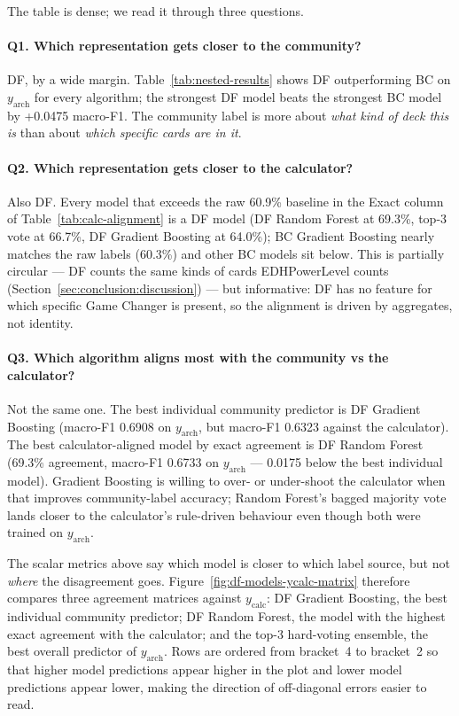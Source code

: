 \documentclass{article}
\begin{document}
The table is dense; we read it through three questions.

\paragraph{Q1. Which representation gets closer to the community?} DF, by a wide margin. Table~\ref{tab:nested-results} shows DF outperforming BC on \(y_{\text{arch}}\) for every algorithm; the strongest DF model beats the strongest BC model by +0.0475 macro-F1. The community label is more about \textit{what kind of deck this is} than about \textit{which specific cards are in it}.

\paragraph{Q2. Which representation gets closer to the calculator?} Also DF. Every model that exceeds the raw 60.9\% baseline in the Exact column of Table~\ref{tab:calc-alignment} is a DF model (DF Random Forest at 69.3\%, top-3 vote at 66.7\%, DF Gradient Boosting at 64.0\%); BC Gradient Boosting nearly matches the raw labels (60.3\%) and other BC models sit below. This is partially circular --- DF counts the same kinds of cards EDHPowerLevel counts (Section~\ref{sec:conclusion:discussion}) --- but informative: DF has no feature for which specific Game Changer is present, so the alignment is driven by aggregates, not identity.

\paragraph{Q3. Which algorithm aligns most with the community vs the calculator?} Not the same one. The best individual community predictor is DF Gradient Boosting (macro-F1 0.6908 on \(y_{\text{arch}}\), but macro-F1 0.6323 against the calculator). The best calculator-aligned model by exact agreement is DF Random Forest (69.3\% agreement, macro-F1 0.6733 on \(y_{\text{arch}}\) --- 0.0175 below the best individual model). Gradient Boosting is willing to over- or under-shoot the calculator when that improves community-label accuracy; Random Forest's bagged majority vote lands closer to the calculator's rule-driven behaviour even though both were trained on \(y_{\text{arch}}\).

The scalar metrics above say which model is closer to which label source, but not \textit{where} the disagreement goes. Figure~\ref{fig:df-models-ycalc-matrix} therefore compares three agreement matrices against \(y_{\text{calc}}\): DF Gradient Boosting, the best individual community predictor; DF Random Forest, the model with the highest exact agreement with the calculator; and the top-3 hard-voting ensemble, the best overall predictor of \(y_{\text{arch}}\). Rows are ordered from bracket~4 to bracket~2 so that higher model predictions appear higher in the plot and lower model predictions appear lower, making the direction of off-diagonal errors easier to read.
\end{document}
